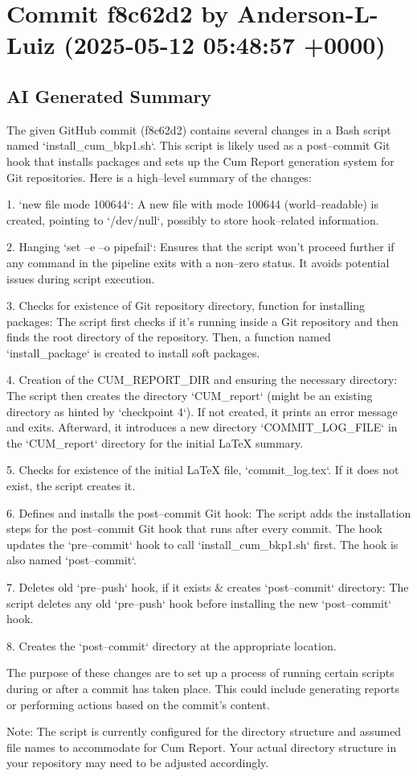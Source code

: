 \documentclass{article}
\begin{document}
\section{Commit f8c62d2 by Anderson-L-Luiz (2025-05-12 05:48:57 +0000)}
\subsection{AI Generated Summary}
{\selectfont
 The given GitHub commit (f8c62d2) contains several changes in a Bash script named `install\_cum\_bkp1.sh`. This script is likely used as a post--commit Git hook that installs packages and sets up the Cum Report generation system for Git repositories. Here is a high--level summary of the changes:

1. `new file mode 100644`: A new file with mode 100644 (world--readable) is created, pointing to `/dev/null`, possibly to store hook--related information.

2. Hanging `set --e --o pipefail`: Ensures that the script won't proceed further if any command in the pipeline exits with a non--zero status. It avoids potential issues during script execution.

3. Checks for existence of Git repository directory, function for installing packages: The script first checks if it's running inside a Git repository and then finds the root directory of the repository. Then, a function named `install\_package` is created to install soft packages.

4. Creation of the CUM\_REPORT\_DIR and ensuring the necessary directory: The script then creates the directory `CUM\_report` (might be an existing directory as hinted by `checkpoint 4`). If not created, it prints an error message and exits. Afterward, it introduces a new directory `COMMIT\_LOG\_FILE` in the `CUM\_report` directory for the initial LaTeX summary.

5. Checks for existence of the initial LaTeX file, `commit\_log.tex`. If it does not exist, the script creates it.

6. Defines and installs the post--commit Git hook: The script adds the installation steps for the post--commit Git hook that runs after every commit. The hook updates the `pre--commit` hook to call `install\_cum\_bkp1.sh` first. The hook is also named `post--commit`.

7. Deletes old `pre--push` hook, if it exists \& creates `post--commit` directory: The script deletes any old `pre--push` hook before installing the new `post--commit` hook.

8. Creates the `post--commit` directory at the appropriate location.

The purpose of these changes are to set up a process of running certain scripts during or after a commit has taken place. This could include generating reports or performing actions based on the commit's content. 

Note: The script is currently configured for the directory structure and assumed file names to accommodate for Cum Report. Your actual directory structure in your repository may need to be adjusted accordingly.
}
\end{document}
